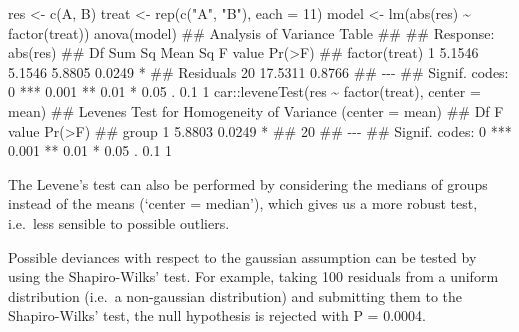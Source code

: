 \documentclass[a4paper,12pt,oneside]{book}
\newenvironment{Shaded}{\begin{snugshade}}{\end{snugshade}}
\newcommand{\DecValTok}[1]{#1}
\newcommand{\SpecialCharTok}[1]{#1}
\newcommand{\StringTok}[1]{#1}
\newcommand{\DocumentationTok}[1]{#1}
\newcommand{\OtherTok}[1]{#1}
\newcommand{\FunctionTok}[1]{#1}
\newcommand{\AttributeTok}[1]{#1}
\newcommand{\NormalTok}[1]{#1}
\begin{document}
\begin{Shaded}
\begin{Highlighting}[]
\NormalTok{res }\OtherTok{\textless{}{-}} \FunctionTok{c}\NormalTok{(A, B)}
\NormalTok{treat }\OtherTok{\textless{}{-}} \FunctionTok{rep}\NormalTok{(}\FunctionTok{c}\NormalTok{(}\StringTok{"A"}\NormalTok{, }\StringTok{"B"}\NormalTok{), }\AttributeTok{each =} \DecValTok{11}\NormalTok{)}
\NormalTok{model }\OtherTok{\textless{}{-}} \FunctionTok{lm}\NormalTok{(}\FunctionTok{abs}\NormalTok{(res) }\SpecialCharTok{\textasciitilde{}} \FunctionTok{factor}\NormalTok{(treat))}
\FunctionTok{anova}\NormalTok{(model)}
\DocumentationTok{\#\# Analysis of Variance Table}
\DocumentationTok{\#\# }
\DocumentationTok{\#\# Response: abs(res)}
\DocumentationTok{\#\#               Df  Sum Sq Mean Sq F value Pr(\textgreater{}F)  }
\DocumentationTok{\#\# factor(treat)  1  5.1546  5.1546  5.8805 0.0249 *}
\DocumentationTok{\#\# Residuals     20 17.5311  0.8766                 }
\DocumentationTok{\#\# {-}{-}{-}}
\DocumentationTok{\#\# Signif. codes:  0 \textquotesingle{}***\textquotesingle{} 0.001 \textquotesingle{}**\textquotesingle{} 0.01 \textquotesingle{}*\textquotesingle{} 0.05 \textquotesingle{}.\textquotesingle{} 0.1 \textquotesingle{} \textquotesingle{} 1}
\NormalTok{car}\SpecialCharTok{::}\FunctionTok{leveneTest}\NormalTok{(res }\SpecialCharTok{\textasciitilde{}} \FunctionTok{factor}\NormalTok{(treat), }\AttributeTok{center =}\NormalTok{ mean)}
\DocumentationTok{\#\# Levene\textquotesingle{}s Test for Homogeneity of Variance (center = mean)}
\DocumentationTok{\#\#       Df F value Pr(\textgreater{}F)  }
\DocumentationTok{\#\# group  1  5.8803 0.0249 *}
\DocumentationTok{\#\#       20                 }
\DocumentationTok{\#\# {-}{-}{-}}
\DocumentationTok{\#\# Signif. codes:  0 \textquotesingle{}***\textquotesingle{} 0.001 \textquotesingle{}**\textquotesingle{} 0.01 \textquotesingle{}*\textquotesingle{} 0.05 \textquotesingle{}.\textquotesingle{} 0.1 \textquotesingle{} \textquotesingle{} 1}
\end{Highlighting}
\end{Shaded}

The Levene's test can also be performed by considering the medians of groups instead of the means (`center = median'), which gives us a more robust test, i.e.~less sensible to possible outliers.

Possible deviances with respect to the gaussian assumption can be tested by using the Shapiro-Wilks' test. For example, taking 100 residuals from a uniform distribution (i.e.~a non-gaussian distribution) and submitting them to the Shapiro-Wilks' test, the null hypothesis is rejected with P = 0.0004.
\end{document}
